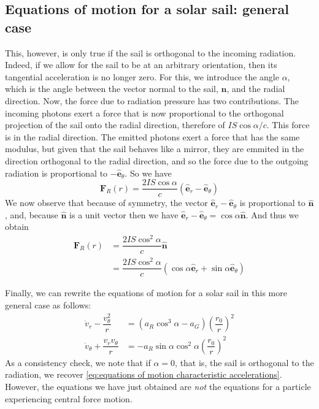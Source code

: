 \documentclass[twocolumn,12pt,a4paper]{article}
\numberwithin{equation}{section}
\begin{document}
\subsection{Equations of motion for a solar sail: general case}
This, however, is only true if the sail is orthogonal to the incoming radiation. Indeed, if we allow for the sail to be at an arbitrary orientation, then its tangential acceleration is no longer zero. For this, we introduce the angle \( \alpha \), which is the angle between the vector normal to the sail, \( \hat{\mathbf{n}} \), and the radial direction. Now, the force due to radiation pressure has two contributions. The incoming photons exert a force that is now proportional to the orthogonal projection of the sail onto the radial direction, therefore of \( IS\cos{\alpha}/c \). This force is in the radial direction. The emitted photons exert a force that has the same modulus, but given that the sail behaves like a mirror, they are emmited in the direction orthogonal to the radial direction, and so the force due to the outgoing radiation is proportional to \( {-\hat{\mathbf{e}}_{\theta}} \). So we have
\begin{equation}
  \mathbf{F}_R(r) = \dfrac{2IS \cos{\alpha}}{c} ( \hat{\mathbf{e}}_{r} - \hat{\mathbf{e}}_{\theta})
\end{equation}
We now observe that because of symmetry, the vector \( \hat{\mathbf{e}}_{r} - \hat{\mathbf{e}}_{\theta}  \) is proportional to \( \hat{\mathbf{n}} \), and, because \( \hat{\mathbf{n}} \) is a unit vector then we have \( \hat{\mathbf{e}}_{r} - \hat{\mathbf{e}}_{\theta} = \cos{\alpha} \hat{\mathbf{n}} \). 
And thus we obtain
\begin{align}
  \mathbf{F}_R(r) &= \dfrac{2IS \cos^2{\alpha}}{c} \hat{\mathbf{n}} \\
									&= \dfrac{2IS \cos^2{\alpha}}{c} (\cos{\alpha} \hat{\mathbf{e}}_r + \sin{\alpha} \hat{\mathbf{e}}_{\theta}) 
\end{align}

Finally, we can rewrite the equations of motion for a solar sail in this more general case as follows:
\begin{align}
  \dot{v}_r - \dfrac{v_{\theta}^2}{r} &= (a_R \cos^3{\alpha} - a_G) \left(\dfrac{r_0}{r}\right)^2\label{carlessexy} \\ 
  \dot{v}_{\theta} + \dfrac{v_r v_{\theta}}{r} &= -a_R	\sin{\alpha} \cos^2{\alpha} \left(\dfrac{r_0}{r}\right)^2\label{carlessexy2}
\end{align}
As a consistency check,  we note that if \( \alpha = 0 \), that is, the sail is orthogonal to the radiation, we recover \autoref{eq:equations of motion characteristic accelerations}. However, the equations we have just obtained are \emph{not} the equations for a particle experiencing central force motion.   
\end{document}
